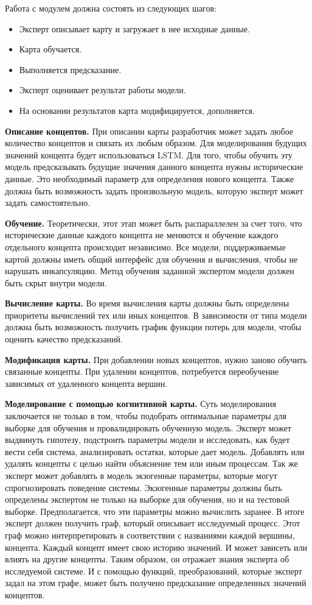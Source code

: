 Работа с модулем должна состоять из следующих шагов:
\begin{itemize}
	\item Эксперт описывает карту и загружает в нее исходные данные.
	\item Карта обучается.
	\item Выполняется предсказание.
	\item Эксперт оценивает результат работы модели.
	\item На основании результатов карта модифицируется, дополняется.
\end{itemize}

\textbf{Описание концептов.}
При описании карты разработчик может задать
любое количество концептов и связать их любым образом.
Для моделирования будущих значений концепта
будет использоваться LSTM. Для того, чтобы обучить
эту модель предсказывать будущие значения данного концепта
нужны исторические данные. Это необходимый параметр для определения
нового концепта.
Также должна быть возможность задать произвольную модель,
которую эксперт может задать самостоятельно.

\textbf{Обучение.}
Теоретически, этот этап может быть распараллелен
за счет того, что исторические данные каждого концепта не меняются
и обучение каждого отдельного концепта происходит независимо.
Все модели, поддерживаемые картой должны
иметь общий интерфейс для обучения и вычисления,
чтобы не нарушать инкапсуляцию.
Метод обучения заданной экспертом модели должен быть скрыт внутри модели.

\textbf{Вычисление карты.}
Во время вычисления карты должны быть определены приоритеты
вычислений тех или иных концептов.
В зависимости от типа модели должна быть возможность получить
график функции потерь для модели, чтобы оценить качество предсказаний.

\textbf{Модификация карты.}
При добавлении новых концептов, нужно заново обучить
связанные концепты. При удалении концептов, потребуется
переобучение зависимых от удаленного концепта вершин.

\textbf{Моделирование с помощью когнитивной карты.}
Суть моделирования заключается не только в том, чтобы подобрать
оптимальные параметры для выборке для обучения и провалидировать обученную модель.
Эксперт может выдвинуть гипотезу, подстроить параметры модели
и исследовать, как будет вести себя система, анализировать
остатки, которые дает модель. Добавлять или удалять концепты с
целью найти объяснение тем или иным процессам. Так же эксперт
может добавлять в модель экзогенные параметры, которые могут
спрогнозировать поведение системы. Экзогенные параметры
должны быть определены экспертом не только на выборке для обучения,
но и на тестовой выборке. Предполагается, что эти параметры можно вычислить заранее.
В итоге эксперт должен получить граф, который описывает
исследуемый процесс. Этот граф можно интерпретировать
в соответствии с названиями каждой вершины, концепта.
Каждый концепт имеет свою историю значений. И может зависеть или
влиять на другие концепты. Таким образом, он отражает знания
эксперта об исследуемой системе. И с помощью функций, преобразований,
которые эксперт задал на этом графе, может быть получено предсказание
определенных значений концептов.

